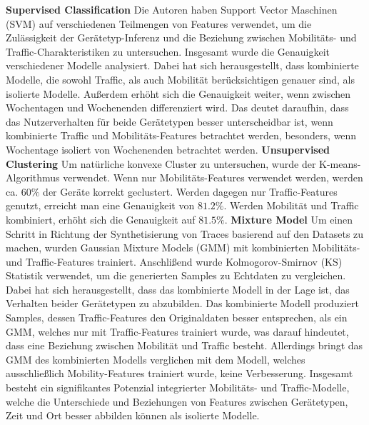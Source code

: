 \documentclass[12pt, a4paper]{article}
\begin{document}
\vfill
\pagebreak

\textbf{Supervised Classification}\newline
Die Autoren haben Support Vector Maschinen (SVM) auf verschiedenen Teilmengen von Features
verwendet, um die Zulässigkeit der Gerätetyp-Inferenz und die Beziehung zwischen Mobilitäts- und Traffic-Charakteristiken
zu untersuchen. Insgesamt wurde die Genauigkeit verschiedener Modelle analysiert. Dabei hat sich herausgestellt,
dass kombinierte Modelle, die sowohl Traffic, als auch Mobilität berücksichtigen genauer sind,
als isolierte Modelle. Außerdem erhöht sich die Genauigkeit weiter, wenn zwischen Wochentagen und Wochenenden differenziert wird.
Das deutet daraufhin, dass das Nutzerverhalten für beide Gerätetypen besser unterscheidbar ist, wenn kombinierte
Traffic und Mobilitäts-Features betrachtet werden, besonders, wenn Wochentage isoliert von Wochenenden betrachtet werden.
\newline\newline
\textbf{Unsupervised Clustering}\newline
Um natürliche konvexe Cluster zu untersuchen, wurde der K-means-Algorithmus verwendet.
Wenn nur Mobilitäts-Features verwendet werden, werden ca. $60 \%$ der Geräte korrekt geclustert.
Werden dagegen nur Traffic-Features genutzt, erreicht man eine Genauigkeit von $81.2 \%$.
Werden Mobilität und Traffic kombiniert, erhöht sich die Genauigkeit auf $81.5 \%$.
\newline\newline
\textbf{Mixture Model}\newline
Um einen Schritt in Richtung der Synthetisierung von Traces basierend auf den Datasets zu machen,
wurden Gaussian Mixture Models (GMM) mit kombinierten Mobilitäts- und Traffic-Features trainiert.
Anschlißend wurde Kolmogorov-Smirnov (KS) Statistik verwendet, um die generierten Samples zu Echtdaten zu vergleichen.
Dabei hat sich herausgestellt, dass das kombinierte Modell in der Lage ist, das Verhalten beider Gerätetypen zu abzubilden.
Das kombinierte Modell produziert Samples, dessen Traffic-Features den Originaldaten besser entsprechen, als ein GMM,
welches nur mit Traffic-Features trainiert wurde, was darauf hindeutet, dass eine Beziehung zwischen Mobilität und Traffic besteht.
Allerdings bringt das GMM des kombinierten Modells verglichen mit dem Modell, welches ausschließlich Mobility-Features trainiert wurde,
keine Verbesserung.
\newline\newline
Insgesamt besteht ein signifikantes Potenzial integrierter Mobilitäts- und Traffic-Modelle, welche die Unterschiede
und Beziehungen von Features zwischen Gerätetypen, Zeit und Ort besser abbilden können als isolierte Modelle.
\end{document}
